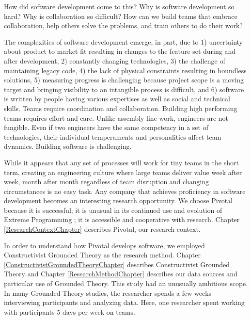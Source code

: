 How did software development come to this? Why is software development so hard? Why is collaboration so difficult? How can we build teams that embrace collaboration, help others solve the problems, and train others to do their work?

The complexities of software development emerge, in part, due to 1) uncertainty about product to market fit resulting in changes to the feature set during and after development, 2) constantly changing technologies, 3) the challenge of maintaining legacy code, 4) the lack of physical constraints resulting in boundless solutions, 5) measuring progress is challenging because project scope is a moving target and bringing visibility to an intangible process is difficult, and 6) software is written by people having various expertises as well as social and technical skills. Teams require coordination and collaboration. Building high performing teams requires effort and care. Unlike assembly line work, engineers are not fungible. Even if two engineers have the same competency in a set of technologies, their individual temperaments and personalities affect team dynamics. Building software is challenging. 

While it appears that any set of processes will work for tiny teams in the short term, creating an engineering culture where large teams deliver value week after week, month after month regardless of team disruption and changing circumstances is no easy task. Any company that achieves proficiency in software development becomes an interesting research opportunity. We choose Pivotal because it is successful; it is unusual in its continued use and evolution of Extreme Programming \cite{BeckExtremeProgramming2004};  it is accessible and cooperative with research. Chapter \ref{ResearchContextChapter} describes Pivotal, our research context. 

In order to understand how Pivotal develops software, we employed Constructivist Grounded Theory as the research method. Chapter \ref{ConstructivistGroundedTheoryChapter} describes Constructivist Grounded Theory and Chapter \ref{ResearchMethodChapter} describes our data sources and particular use of Grounded Theory. This study had an unusually ambitious scope. In many Grounded Theory studies, the researcher spends a few weeks interviewing participants and analyzing data. Here, one researcher spent \durationOfResearchStudyPlural{} working with participants 5 days per week on \numberOfObservedProjects{} teams. 

